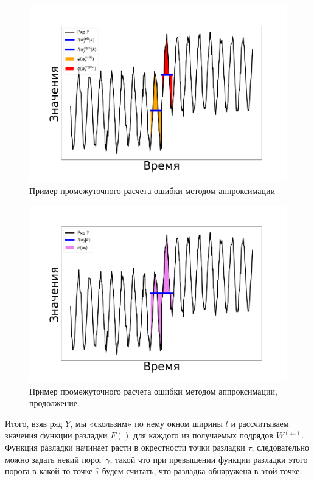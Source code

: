 \documentclass[%
12pt,
master,  %
natbib,      %
subf,        %
substylefile = spbu.rtx,
href,        %
colorlinks,  %
]{disser}
\begin{document}
\begin{figure}[!hhh]
	\begin{center}
		\includegraphics[width=12cm]{approaches_second_2_ru}
	\end{center}
	\vspace{-5mm}\caption{Пример промежуточного расчета ошибки методом аппроксимации}
	\label{fig:approximation_example_1}
\end{figure}

\begin{figure}[!hhh]
	\begin{center}
		\includegraphics[width=12cm]{approaches_second_3_ru}
	\end{center}
	\vspace{-5mm}\caption{Пример промежуточного расчета ошибки методом аппроксимации, продолжение.}
	\label{fig:approximation_example_2}
\end{figure}


Итого, взяв ряд $Y$, мы «скользим» по нему окном ширины $l$ и рассчитываем значения функции разладки $F()$ для каждого из получаемых подрядов $W^{\mathrm{(all)}}$. Функция разладки начинает расти в окрестности точки разладки $\tau$, следовательно можно задать некий порог $\gamma$, такой что при превышении функции разладки этого порога в какой-то точке $\hat{\tau}$ будем считать, что разладка обнаружена в этой точке.
\end{document}
